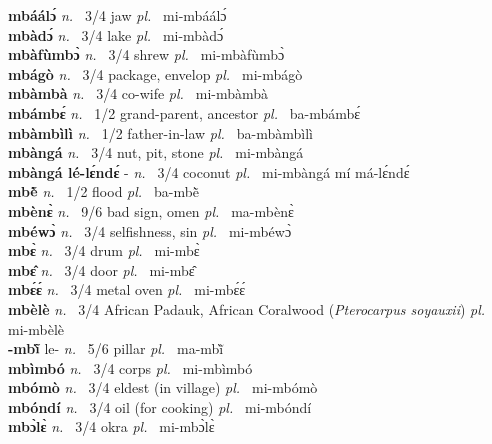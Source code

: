 \noindent
{\bfseries mbáálɔ́}  {\itshape n.~} 3/4 jaw {\itshape pl.~} mi-mbáálɔ́    \\ 
{\bfseries mbàdɔ́}  {\itshape n.~} 3/4 lake {\itshape pl.~} mi-mbàdɔ́    \\ 
{\bfseries mbàfùmbɔ̀}  {\itshape n.~} 3/4 shrew  {\itshape pl.~} mi-mbàfùmbɔ̀    \\ 
{\bfseries mbágò}  {\itshape n.~} 3/4 package, envelop {\itshape pl.~} mi-mbágò    \\ 
{\bfseries mbàmbà}  {\itshape n.~} 3/4 co-wife {\itshape pl.~} mi-mbàmbà    \\ 
{\bfseries mbámbɛ́}  {\itshape n.~} 1/2 grand-parent, ancestor {\itshape pl.~} ba-mbámbɛ́    \\ 
{\bfseries mbàmbìlì}  {\itshape n.~} 1/2 father-in-law {\itshape pl.~} ba-mbàmbìlì    \\ 
{\bfseries mbàngá}  {\itshape n.~} 3/4 nut, pit, stone {\itshape pl.~} mi-mbàngá    \\ 
{\bfseries mbàngá lé-lɛ́ndɛ́} - {\itshape n.~} 3/4 coconut {\itshape pl.~} mi-mbàngá mí má-lɛ́ndɛ́    \\ 
{\bfseries mbẽ̀}  {\itshape n.~} 1/2 flood {\itshape pl.~} ba-mbẽ̀    \\ 
{\bfseries mbènɛ̀}  {\itshape n.~} 9/6  bad sign, omen {\itshape pl.~} ma-mbènɛ̀    \\ 
{\bfseries mbéwɔ̀}  {\itshape n.~} 3/4 selfishness, sin {\itshape pl.~} mi-mbéwɔ̀    \\ 
{\bfseries mbɛ̀}  {\itshape n.~} 3/4 drum {\itshape pl.~} mi-mbɛ̀    \\ 
{\bfseries mbɛ̂}  {\itshape n.~} 3/4 door {\itshape pl.~} mi-mbɛ̂    \\ 
{\bfseries mbɛ́ɛ́}  {\itshape n.~} 3/4 metal oven {\itshape pl.~} mi-mbɛ́ɛ́    \\ 
{\bfseries mbèlè}  {\itshape n.~} 3/4 African Padauk, African Coralwood ({\itshape Pterocarpus soyauxii}) {\itshape pl.~} mi-mbèlè    \\ 
{\bfseries -mbĩ̀} le- {\itshape n.~} 5/6 pillar {\itshape pl.~} ma-mbĩ̀    \\ 
{\bfseries mbìmbó}  {\itshape n.~} 3/4 corps {\itshape pl.~} mi-mbìmbó    \\ 
{\bfseries mbómò}  {\itshape n.~} 3/4 eldest (in village) {\itshape pl.~} mi-mbómò    \\ 
{\bfseries mbóndí}  {\itshape n.~} 3/4 oil (for cooking) {\itshape pl.~} mi-mbóndí    \\ 
{\bfseries mbɔ̀lɛ̀}  {\itshape n.~} 3/4 okra {\itshape pl.~} mi-mbɔ̀lɛ̀    \\ 
